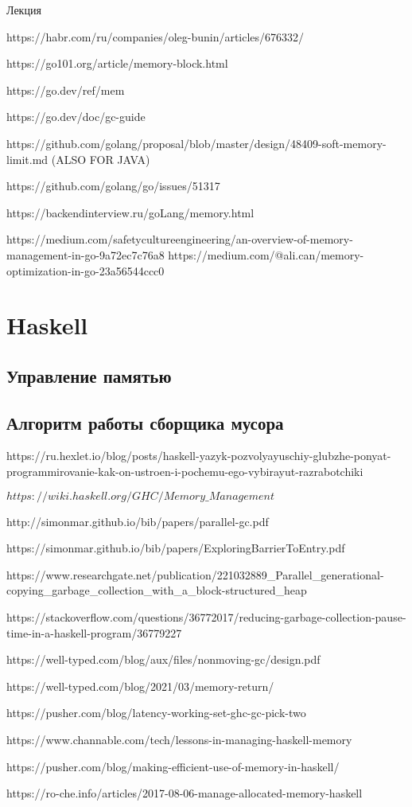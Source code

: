Лекция

https://habr.com/ru/companies/oleg-bunin/articles/676332/

https://go101.org/article/memory-block.html

https://go.dev/ref/mem

https://go.dev/doc/gc-guide

https://github.com/golang/proposal/blob/master/design/48409-soft-memory-limit.md (ALSO FOR JAVA)

https://github.com/golang/go/issues/51317

https://backendinterview.ru/goLang/memory.html



https://medium.com/safetycultureengineering/an-overview-of-memory-management-in-go-9a72ec7c76a8
https://medium.com/@ali.can/memory-optimization-in-go-23a56544ccc0





\section{Haskell}
\subsection{Управление памятью}
\subsection{Алгоритм работы сборщика мусора}

https://ru.hexlet.io/blog/posts/haskell-yazyk-pozvolyayuschiy-glubzhe-ponyat-programmirovanie-kak-on-ustroen-i-pochemu-ego-vybirayut-razrabotchiki



$https://wiki.haskell.org/GHC/Memory\_Management$

http://simonmar.github.io/bib/papers/parallel-gc.pdf

https://simonmar.github.io/bib/papers/ExploringBarrierToEntry.pdf

https://www.researchgate.net/publication/221032889\_Parallel\_generational-copying\_garbage\_collection\_with\_a\_block-structured\_heap

https://stackoverflow.com/questions/36772017/reducing-garbage-collection-pause-time-in-a-haskell-program/36779227

https://well-typed.com/blog/aux/files/nonmoving-gc/design.pdf

https://well-typed.com/blog/2021/03/memory-return/

https://pusher.com/blog/latency-working-set-ghc-gc-pick-two



https://www.channable.com/tech/lessons-in-managing-haskell-memory

https://pusher.com/blog/making-efficient-use-of-memory-in-haskell/

https://ro-che.info/articles/2017-08-06-manage-allocated-memory-haskell
